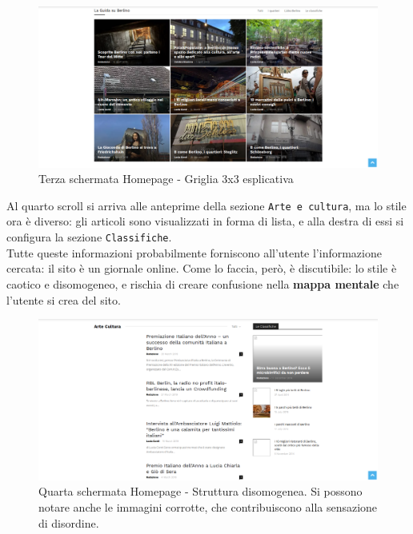\begin{figure}[htbp]
\begin{center}
\includegraphics[width=35em]{img/home3}
\caption{Terza schermata Homepage - Griglia 3x3 esplicativa}
\end{center}
\end{figure}
\vspace{30pt}


Al quarto scroll si arriva alle anteprime della sezione \texttt{Arte e cultura}, ma lo stile ora è diverso: gli articoli sono visualizzati in forma di lista, e alla destra di essi si configura la sezione \texttt{Classifiche}. \\
Tutte queste informazioni probabilmente forniscono all'utente l'informazione cercata: il sito è un giornale online. Come lo faccia, però, è discutibile: lo stile è caotico e disomogeneo, e rischia di creare confusione nella \textbf{mappa mentale} che l'utente si crea del sito. \\

\vspace{30pt}
\begin{figure}[htbp]
\begin{center}
\includegraphics[width=35em]{img/home4}
\caption{Quarta schermata Homepage - Struttura disomogenea. Si possono notare anche le immagini corrotte, che contribuiscono alla sensazione di disordine.}
\end{center}
\end{figure}
\vspace{30pt}

